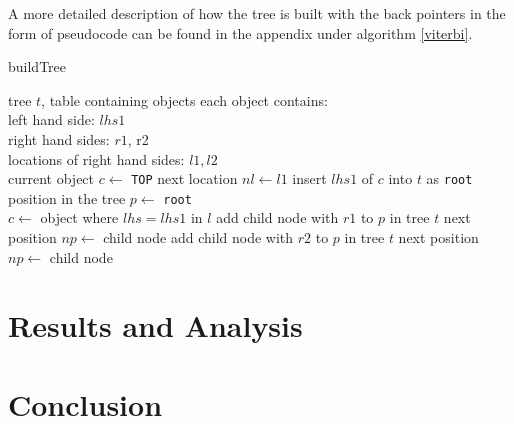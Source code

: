 \documentclass[11pt,twocolumn]{article}
\begin{document}
A more detailed description of how the tree is built with the back pointers in the form of pseudocode can be found in the appendix under algorithm \ref{viterbi}.
\begin{algorithm}
\caption{buildTree}
\label{viterbi}
\begin{algorithmic}[1]
\Require tree $t$, table containing objects
\Ensure each object contains: \\
left hand side: $lhs1$\\right hand sides: $r1$, r2\\
locations of right hand sides: $l1, l2$
\\
\State current object $c \gets$ \texttt{TOP} 
\State next location $nl \gets l1$
\State insert $lhs1$ of $c$ into $t$ as \texttt{root}
\State position in the tree $p \gets$ \texttt{root}
\State {}
\\
\State $c \gets$ object where $lhs=lhs1$ in $l$
\State add child node with $r1$ to $p$ in tree $t$
\State next position $np \gets$ child node
\State {} 
\State add child node with $r2$ to $p$ in tree $t$
\State next position $np \gets$ child node
\State {} 
\EndIf
\EndProcedure
\end{algorithmic}
\end{algorithm}

\section{Results and Analysis}

\section{Conclusion}




\end{document}
